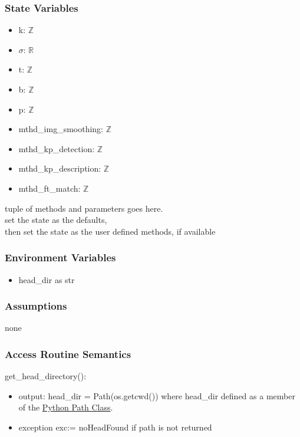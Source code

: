 \documentclass[12pt, titlepage]{article}
\begin{document}
\subsubsection{State Variables}
\begin{itemize}
  \item k: $\mathbb{Z}$
  \item $\sigma$: $\mathbb{R}$
  \item t: $\mathbb{Z}$
  \item b: $\mathbb{Z}$
  \item p: $\mathbb{Z}$
  \item mthd\_img\_smoothing: $\mathbb{Z}$
  \item mthd\_kp\_detection: $\mathbb{Z}$
  \item mthd\_kp\_description: $\mathbb{Z}$
  \item mthd\_ft\_match: $\mathbb{Z}$
\end{itemize}

tuple of methods and parameters goes here.\\
set the state as the defaults, \\
then set the state as the user defined methods, if available


\subsubsection{Environment Variables}
\begin{itemize}
  \item head\_dir as str
\end{itemize}

\subsubsection{Assumptions}
none 

\subsubsection{Access Routine Semantics}
\noindent get\_head\_directory():
\begin{itemize}
  \item output: head\_dir = Path(os.getcwd()) where head\_dir defined as 
  a member of the \href{https://docs.python.org/3/library/os.path.html}{Python Path Class}.
  \item exception exc:= noHeadFound if path is not returned
\end{itemize}
\end{document}
